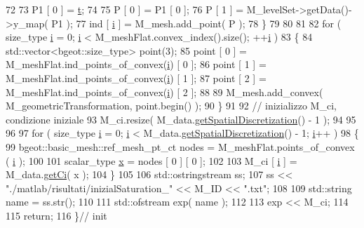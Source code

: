 \begin{DoxyCode}
72 
73         P1 [ 0 ] = \hyperlink{discontinuo_8m_aaccc9105df5383111407fd5b41255e23}{t};
74 
75         P [ 0 ] = P1 [ 0 ];
76         P [ 1 ] =  M\_levelSet->getData()->y\_map( P1 );
77         ind [ \hyperlink{god__e_8m_a8604be5925f4266ab5ccc69675329c80}{i} ] = M\_mesh.add\_point( P );
78     \}
79 
80 
81 
82     \textcolor{keywordflow}{for} ( size\_type \hyperlink{god__e_8m_a8604be5925f4266ab5ccc69675329c80}{i} = 0; \hyperlink{god__e_8m_a8604be5925f4266ab5ccc69675329c80}{i} < M\_meshFlat.convex\_index().size(); ++\hyperlink{god__e_8m_a8604be5925f4266ab5ccc69675329c80}{i} )
83     \{
84         std::vector<bgeot::size\_type> point(3);
85         point [ 0 ] = M\_meshFlat.ind\_points\_of\_convex(\hyperlink{god__e_8m_a8604be5925f4266ab5ccc69675329c80}{i}) [ 0 ];
86         point [ 1 ] = M\_meshFlat.ind\_points\_of\_convex(\hyperlink{god__e_8m_a8604be5925f4266ab5ccc69675329c80}{i}) [ 1 ];
87         point [ 2 ] = M\_meshFlat.ind\_points\_of\_convex(\hyperlink{god__e_8m_a8604be5925f4266ab5ccc69675329c80}{i}) [ 2 ];
88 
89         M\_mesh.add\_convex( M\_geometricTransformation, point.begin() );
90     \}
91 
92     \textcolor{comment}{// inizializzo M\_ci, condizione iniziale}
93     M\_ci.resize( M\_data.\hyperlink{classFractureData_aeb3c6a78af1e2746bf5ce69c9ae8945d}{getSpatialDiscretization}() - 1 );
94 
95 
96 
97     \textcolor{keywordflow}{for} ( size\_type \hyperlink{god__e_8m_a8604be5925f4266ab5ccc69675329c80}{i} = 0; \hyperlink{god__e_8m_a8604be5925f4266ab5ccc69675329c80}{i} < M\_data.\hyperlink{classFractureData_aeb3c6a78af1e2746bf5ce69c9ae8945d}{getSpatialDiscretization}() - 1; 
      \hyperlink{god__e_8m_a8604be5925f4266ab5ccc69675329c80}{i}++ )
98     \{
99         bgeot::basic\_mesh::ref\_mesh\_pt\_ct nodes = M\_meshFlat.points\_of\_convex ( 
      \hyperlink{god__e_8m_a8604be5925f4266ab5ccc69675329c80}{i} );
100 
101         scalar\_type \hyperlink{confronto_8m_ad2e52d4a42a755ccd73c8de47175afa3}{x} = nodes [ 0 ] [ 0 ];
102 
103         M\_ci [ \hyperlink{god__e_8m_a8604be5925f4266ab5ccc69675329c80}{i} ] = M\_data.\hyperlink{classFractureData_a142a1bb428365b60ed002362ca566517}{getCi}( x );
104     \}
105 
106     std::ostringstream ss;
107     ss << \textcolor{stringliteral}{"./matlab/risultati/inizialSaturation\_"} << M\_ID << \textcolor{stringliteral}{".txt"};
108 
109     std::string name = ss.str();
110 
111     std::ofstream exp( name );
112 
113     exp << M\_ci;
114 
115     \textcolor{keywordflow}{return};
116 \}\textcolor{comment}{// init}
\end{DoxyCode}


